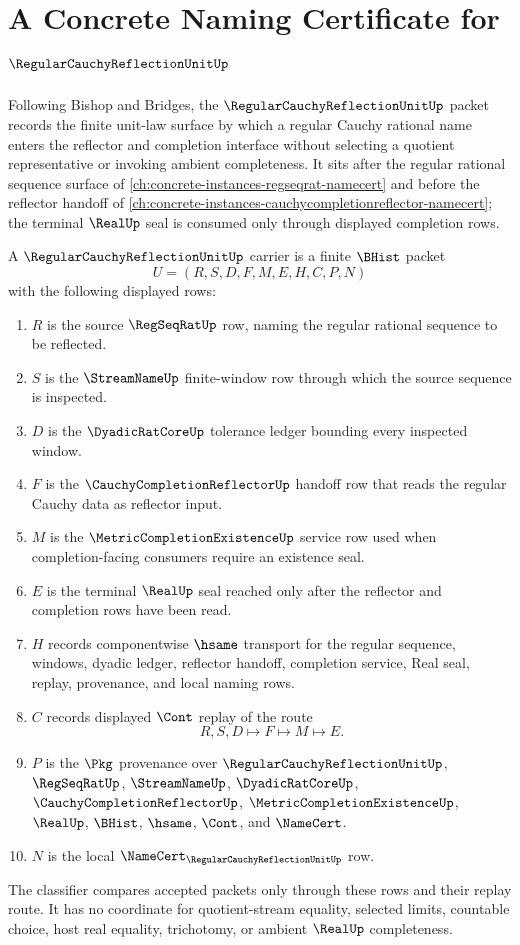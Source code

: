 \chapter{A Concrete Naming Certificate for $\RegularCauchyReflectionUnitUp$}
\label{ch:concrete-instances-regular-cauchy-reflection-unit-namecert}

Following Bishop and Bridges, the $\RegularCauchyReflectionUnitUp$ packet records the finite unit-law surface by which a regular Cauchy rational name enters the reflector and completion interface without selecting a quotient representative or invoking ambient completeness. It sits after the regular rational sequence surface of \autoref{ch:concrete-instances-regseqrat-namecert} and before the reflector handoff of \autoref{ch:concrete-instances-cauchycompletionreflector-namecert}; the terminal $\RealUp$ seal is consumed only through displayed completion rows.

\begin{definition}
\label{def:regular-cauchy-reflection-unit-carrier}
A $\RegularCauchyReflectionUnitUp$ carrier is a finite $\BHist$ packet
$$
U=(R,S,D,F,M,E,H,C,P,N)
$$
with the following displayed rows:
\begin{enumerate}
\item $R$ is the source $\RegSeqRatUp$ row, naming the regular rational sequence to be reflected.
\item $S$ is the $\StreamNameUp$ finite-window row through which the source sequence is inspected.
\item $D$ is the $\DyadicRatCoreUp$ tolerance ledger bounding every inspected window.
\item $F$ is the $\CauchyCompletionReflectorUp$ handoff row that reads the regular Cauchy data as reflector input.
\item $M$ is the $\MetricCompletionExistenceUp$ service row used when completion-facing consumers require an existence seal.
\item $E$ is the terminal $\RealUp$ seal reached only after the reflector and completion rows have been read.
\item $H$ records componentwise $\hsame$ transport for the regular sequence, windows, dyadic ledger, reflector handoff, completion service, Real seal, replay, provenance, and local naming rows.
\item $C$ records displayed $\Cont$ replay of the route
$$
R,S,D \longmapsto F \longmapsto M \longmapsto E .
$$
\item $P$ is the $\Pkg$ provenance over $\RegularCauchyReflectionUnitUp$, $\RegSeqRatUp$, $\StreamNameUp$, $\DyadicRatCoreUp$, $\CauchyCompletionReflectorUp$, $\MetricCompletionExistenceUp$, $\RealUp$, $\BHist$, $\hsame$, $\Cont$, and $\NameCert$.
\item $N$ is the local $\NameCert_{\RegularCauchyReflectionUnitUp}$ row.
\end{enumerate}
The classifier compares accepted packets only through these rows and their replay route. It has no coordinate for quotient-stream equality, selected limits, countable choice, host real equality, trichotomy, or ambient $\RealUp$ completeness.
\end{definition}

